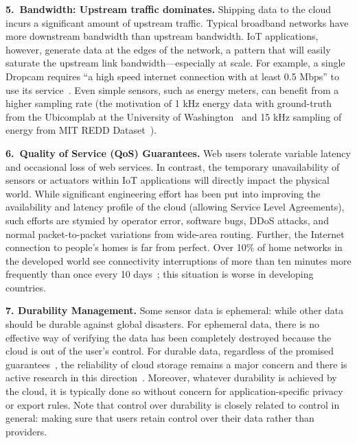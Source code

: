 
\noindent\textbf{5.~Bandwidth: Upstream traffic dominates.}  Shipping data to the
cloud incurs a significant amount of upstream traffic.  Typical broadband
networks have more downstream bandwidth than upstream bandwidth.  IoT
applications, however, generate data at the edges of the network, a pattern that
will easily saturate the upstream link bandwidth---especially at scale.  For
example, a single Dropcam requires ``a high speed internet connection with at
least 0.5 Mbps'' to use its service~\cite{dropcam}.  Even simple sensors, such
as energy meters, can benefit from a higher sampling rate (the motivation of 1
kHz energy data with ground-truth from the Ubicomplab at the University of
Washington~\cite{gupta2015household} and 15 kHz sampling of energy from MIT REDD
Dataset~\cite{kolter2011redd}).

\noindent\textbf{6.~Quality of Service (QoS) Guarantees.} Web users
tolerate variable latency and occasional loss of web services.  In contrast, the
temporary unavailability of sensors or actuators within IoT applications will
directly impact the physical world.  While significant engineering effort has
been put into improving the availability and latency profile of the cloud
(allowing Service Level Agreements), such efforts are stymied by operator error,
software bugs, DDoS attacks, and normal packet-to-packet variations from
wide-area routing. Further, the Internet connection to people's homes is far
from perfect.  Over 10\% of home networks in the developed world see
connectivity interruptions of more than ten minutes more frequently than once
every 10 days~\cite{grover2013peeking}; this situation is worse in developing
countries.

\noindent\textbf{7. Durability Management.} Some sensor
data is ephemeral: while other data should be durable against global disasters.
For ephemeral data, there is no effective way of verifying the data has been
completely destroyed because the cloud is out of the user's control. For
durable data, regardless of the promised guarantees~\cite{s3durability}, the
reliability of cloud storage remains a major concern and there is active
research in this direction~\cite{bessani2013depsky}.  Moreover, whatever
durability is achieved by the cloud, it is typically done so without concern for
application-specific privacy or export rules.  Note that control over durability
is closely related to control in general: making sure that users retain control
over their data rather than providers.


